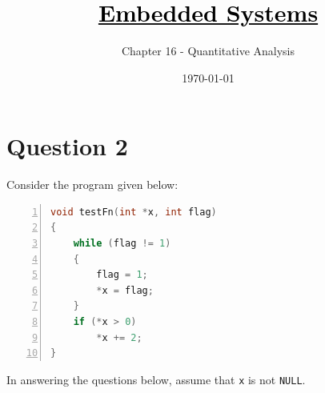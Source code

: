 \documentclass[12pt]{article}
\title{\href{https://github.com/M-Sc-AUT/M.Sc-Computer-Architecture/tree/main/Embedded Systems Modeling and Design}{\textcolor{black}{Embedded Systems}}}
\subtitle{Chapter 16 - Quantitative Analysis}
\date{\today}
\begin{document}
\maketitlepage
\maketitlestart







\section{Question 2}
Consider the program given below:

\begin{lstlisting}[language=C, keywordstyle=\color{blue}\bfseries, commentstyle=\color{green}, basicstyle=\ttfamily\small, numbers=left, numberstyle=\tiny, stepnumber=1, numbersep=5pt]
void testFn(int *x, int flag) 
{
	while (flag != 1) 
	{
		flag = 1;
		*x = flag;
	}
	if (*x > 0)
		*x += 2;
}
\end{lstlisting}

In answering the questions below, assume that \texttt{x} is not \texttt{NULL}.
\end{document}

